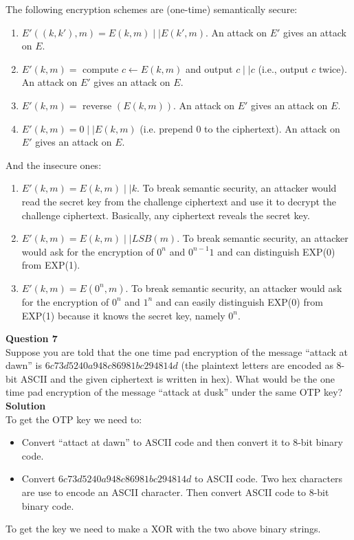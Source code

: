 \documentclass[a4paper,12pt]{article}
\begin{document}
The following encryption schemes are (one-time) semantically secure:
%
\begin{enumerate}
%
\item $E'((k,k'), m)=E(k,m)\mid \mid E(k',m)$. An attack on $E'$ gives an attack on $E$.
\item $E'(k,m)=$ compute $c\leftarrow E(k,m)$ and output  $c\mid \mid c$ (i.e., output $c$ twice). An attack on $E'$ gives an attack on $E$.
\item $E'(k,m)=$ reverse $(E(k,m))$. An attack on $E'$ gives an attack on $E$.
\item $E'(k,m)=0 \mid \mid E(k,m)$ (i.e. prepend 0 to the ciphertext). An attack on $E'$ gives an attack on $E$.
%
\end{enumerate}
%
And the insecure ones:
%
\begin{enumerate}
\item $E'(k,m)=E(k,m)\mid \mid k$. To break semantic security, an attacker would read the secret key from the challenge ciphertext and use it to decrypt the challenge ciphertext. Basically, any ciphertext reveals the secret key.
\item $E'(k,m)=E(k,m)\mid \mid LSB(m)$. To break semantic security, an attacker would ask for the encryption of $0^{n}$ and $0^{n-1}1$ and can distinguish EXP(0) from EXP(1).
\item $E'(k,m)=E(0^{n},m)$. To break semantic security, an attacker would ask for the encryption of $0^{n}$ and $1^{n}$ and can easily distinguish EXP(0) from EXP(1) because it knows the secret key, namely $0^{n}$.
\end{enumerate}

\textbf{Question 7}\\

Suppose you are told that the one time pad encryption of the message ``attack at dawn'' is $6c73d5240a948c86981bc294814d$ (the plaintext letters are encoded as 8-bit ASCII and the given ciphertext is written in hex). What would be the one time pad encryption of the message ``attack at dusk'' under the same OTP key?\\

\textbf{Solution}\\

To get the OTP key we need to:
%
\begin{itemize}
\item Convert ``attact at dawn'' to ASCII code and then convert it to 8-bit binary code.
\item Convert $6c73d5240a948c86981bc294814d$ to ASCII code. Two hex characters are use to encode an ASCII character. Then convert ASCII code to  8-bit binary code.
\end{itemize}
%
To get the key we need to make a XOR with the two above binary strings.\\
\end{document}

